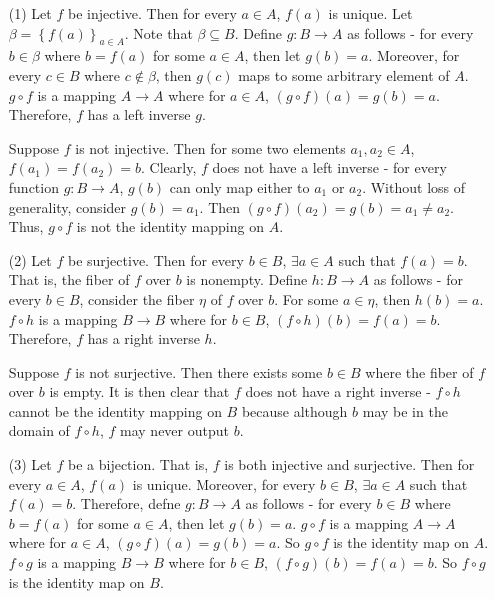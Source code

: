 \documentclass[12pt]{article}
\begin{document}
\begin{itemize}
\item[(1)] Let $f$ be injective. Then for every $a \in A$, $f(a)$ is unique. Let $\beta = \left\lbrace f(a) \right\rbrace_{a \in A}$. Note that $\beta \subseteq B$. Define $g : B \rightarrow A$ as follows - for every $b \in \beta$ where $b = f(a)$ for some $a \in A$, then let $g(b) = a$. Moreover, for every $c \in B$ where $c \not \in \beta$, then $g(c)$ maps to some arbitrary element of $A$. $g \circ f$ is a mapping $A \rightarrow A$ where for $a \in A$, $(g \circ f)(a) = g(b) = a$. Therefore, $f$ has a left inverse $g$.

Suppose $f$ is not injective. Then for some two elements $a_1, a_2 \in A$, $f(a_1) = f(a_2) = b$. Clearly, $f$ does not have a left inverse - for every function $g : B \rightarrow A$, $g(b)$ can only map either to $a_1$ or $a_2$. Without loss of generality, consider $g(b) = a_1$. Then $(g \circ f)(a_2) = g(b) = a_1 \neq a_2$. Thus, $g \circ f$ is not the identity mapping on $A$.

\item[(2)] Let $f$ be surjective. Then for every $b \in B$, $\exists a \in A$ such that $f(a) = b$. That is, the fiber of $f$ over $b$ is nonempty. Define $h : B \rightarrow A$ as follows - for every $b \in B$, consider the fiber $\eta$ of $f$ over $b$. For some $a \in \eta$, then $h(b) = a$. $f \circ h$ is a mapping $B \rightarrow B$ where for $b \in B$, $(f \circ h)(b) = f(a) = b$. Therefore, $f$ has a right inverse $h$.

Suppose $f$ is not surjective. Then there exists some $b \in B$ where the fiber of $f$ over $b$ is empty. It is then clear that $f$ does not have a right inverse - $f \circ h$ cannot be the identity mapping on $B$ because although $b$ may be in the domain of $f \circ h$, $f$ may never output $b$.

\item[(3)] Let $f$ be a bijection. That is, $f$ is both injective and surjective. Then for every $a \in A$, $f(a)$ is unique. Moreover, for every $b \in B$, $\exists a \in A$ such that $f(a) = b$. Therefore, defne $g : B \rightarrow A$ as follows - for every $b \in B$ where $b = f(a)$ for some $a \in A$, then let $g(b) = a$. $g \circ f$ is a mapping $A \rightarrow A$ where for $a \in A$, $(g \circ f)(a) = g(b) = a$. So $g \circ f$ is the identity map on $A$. $f \circ g$ is a mapping $B \rightarrow B$ where for $b \in B$, $(f \circ g)(b) = f(a) = b$. So $f \circ g$ is the identity map on $B$.


\end{itemize}
\end{document}

